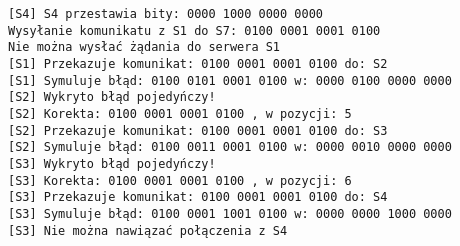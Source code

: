 \begin{empty}
	\begin{verbatim}
[S4] S4 przestawia bity: 0000 1000 0000 0000
Wysyłanie komunikatu z S1 do S7: 0100 0001 0001 0100
Nie można wysłać żądania do serwera S1
[S1] Przekazuje komunikat: 0100 0001 0001 0100 do: S2
[S1] Symuluje błąd: 0100 0101 0001 0100 w: 0000 0100 0000 0000
[S2] Wykryto błąd pojedyńczy!
[S2] Korekta: 0100 0001 0001 0100 , w pozycji: 5
[S2] Przekazuje komunikat: 0100 0001 0001 0100 do: S3
[S2] Symuluje błąd: 0100 0011 0001 0100 w: 0000 0010 0000 0000
[S3] Wykryto błąd pojedyńczy!
[S3] Korekta: 0100 0001 0001 0100 , w pozycji: 6
[S3] Przekazuje komunikat: 0100 0001 0001 0100 do: S4
[S3] Symuluje błąd: 0100 0001 1001 0100 w: 0000 0000 1000 0000
[S3] Nie można nawiązać połączenia z S4
	\end{verbatim}
	\vspace{-10pt}
\end{empty}
